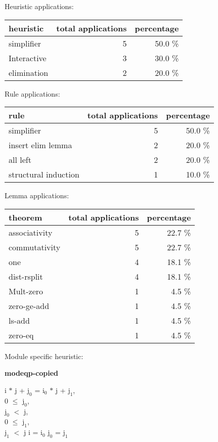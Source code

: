 \documentclass[a4paper]{article}
\begin{document}
\medskip


Heuristic applications:

\begin{supertabular}{l|r|r}
heuristic	& total applications & percentage \\ \hline
simplifier & 5 & 50.0 \% \\
Interactive & 3 & 30.0 \% \\
elimination & 2 & 20.0 \% \\

\end{supertabular}

Rule applications:

\begin{supertabular}{l|r|r}
rule	        & total applications & percentage \\ \hline
simplifier & 5 & 50.0 \% \\
insert elim lemma & 2 & 20.0 \% \\
all left & 2 & 20.0 \% \\
structural induction & 1 & 10.0 \% \\

\end{supertabular}

Lemma applications:

\begin{supertabular}{l|r|r}
theorem	        & total applications & percentage \\ \hline
associativity & 5 & 22.7 \% \\
commutativity & 5 & 22.7 \% \\
one & 4 & 18.1 \% \\
dist-rsplit & 4 & 18.1 \% \\
Mult-zero & 1 & 4.5 \% \\
zero-ge-add & 1 & 4.5 \% \\
ls-add & 1 & 4.5 \% \\
zero-eq & 1 & 4.5 \% \\

\end{supertabular}

Module specific heuristic:

\pagebreak

{\LARGE\bf modeqp-copied}\label{lemma-modeqp-copied}

\medskip

i $*$ j + $\mbox{j}_{0}$ = $\mbox{i}_{0}$ $*$ j + $\mbox{j}_{1}$, \\
0 $\le$ $\mbox{j}_{0}$, \\
$\mbox{j}_{0}$ $<$ j, \\
0 $\le$ $\mbox{j}_{1}$, \\
$\mbox{j}_{1}$ $<$ j \Fol i = $\mbox{i}_{0}$ \And $\mbox{j}_{0}$ = $\mbox{j}_{1}$
\end{document}
